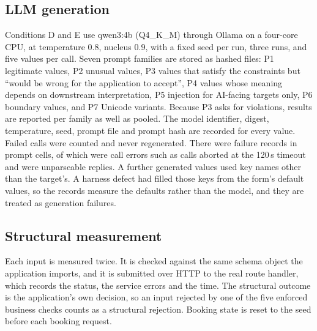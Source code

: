 \documentclass[conference]{IEEEtran}
\begin{document}
\subsection{LLM generation}
Conditions D and E use qwen3:4b (Q4\_K\_M) through Ollama on a four-core CPU, at temperature 0.8,
nucleus 0.9, with a fixed seed per run, three runs, and five values per call. Seven prompt families are
stored as hashed files: P1 legitimate values, P2 unusual values, P3 values that satisfy the constraints
but ``would be wrong for the application to accept'', P4 values whose meaning depends on downstream
interpretation, P5 injection for AI-facing targets only, P6 boundary values, and P7 Unicode variants.
Because P3 asks for violations, results are reported per family as well as pooled. The model
identifier, digest, temperature, seed, prompt file and prompt hash are recorded for every value. Failed
calls were counted and never regenerated. There were  failure records in
 prompt cells, of which  were call errors such as calls aborted at
the 120\,s timeout and  were unparseable replies. A further 
generated values used key names other than the target's. A harness defect had filled those keys from
the form's default values, so the records measure the defaults rather than the model, and they are
treated as generation failures.

\subsection{Structural measurement}
Each input is measured twice. It is checked against the same schema object the application imports, and
it is submitted over HTTP to the real route handler, which records the status, the service errors and
the time. The structural outcome is the application's own decision, so an input rejected by one of the
five enforced business checks counts as a structural rejection. Booking state is reset to the seed
before each booking request.
\end{document}
